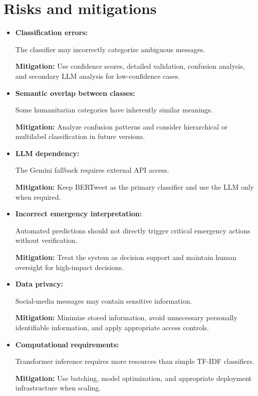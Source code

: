 \documentclass[11pt,a4paper]{article}
\begin{document}

\section{Risks and mitigations}

\begin{itemize}[leftmargin=0.7cm]

    \item \textbf{Classification errors:}

    The classifier may incorrectly categorize ambiguous messages.

    \textbf{Mitigation:} Use confidence scores, detailed validation, confusion
    analysis, and secondary LLM analysis for low-confidence cases.

    \item \textbf{Semantic overlap between classes:}

    Some humanitarian categories have inherently similar meanings.

    \textbf{Mitigation:} Analyze confusion patterns and consider hierarchical
    or multilabel classification in future versions.

    \item \textbf{LLM dependency:}

    The Gemini fallback requires external API access.

    \textbf{Mitigation:} Keep BERTweet as the primary classifier and use the
    LLM only when required.

    \item \textbf{Incorrect emergency interpretation:}

    Automated predictions should not directly trigger critical emergency
    actions without verification.

    \textbf{Mitigation:} Treat the system as decision support and maintain
    human oversight for high-impact decisions.

    \item \textbf{Data privacy:}

    Social-media messages may contain sensitive information.

    \textbf{Mitigation:} Minimize stored information, avoid unnecessary
    personally identifiable information, and apply appropriate access
    controls.

    \item \textbf{Computational requirements:}

    Transformer inference requires more resources than simple TF-IDF
    classifiers.

    \textbf{Mitigation:} Use batching, model optimization, and appropriate
    deployment infrastructure when scaling.

\end{itemize}
\end{document}

